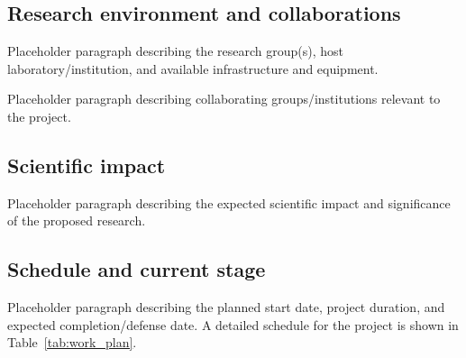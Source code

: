 \documentclass[twocolumn]{NobArticle}
\begin{document}
\subsection{Research environment and collaborations}
Placeholder paragraph describing the research group(s), host laboratory/institution, and available infrastructure and equipment.

Placeholder paragraph describing collaborating groups/institutions relevant to the project.

\subsection{Scientific impact}
Placeholder paragraph describing the expected scientific impact and significance of the proposed research.

\subsection{Schedule and current stage}

Placeholder paragraph describing the planned start date, project duration, and expected completion/defense date. A detailed schedule for the project is shown in Table~\ref{tab:work_plan}.
\end{document}
